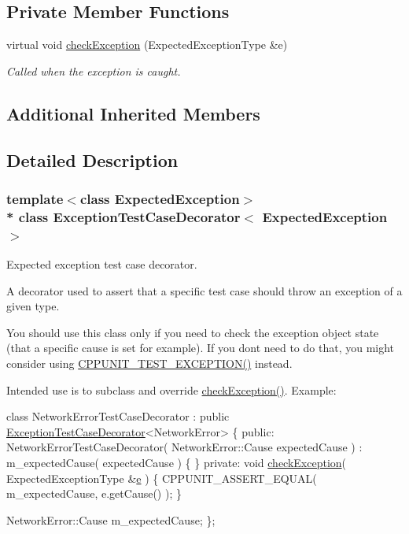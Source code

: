 \subsection*{Private Member Functions}
\begin{DoxyCompactItemize}
\item 
virtual void \hyperlink{class_exception_test_case_decorator_aecb2895a975aacdcafdc3b625e2ca9c1}{check\+Exception} (Expected\+Exception\+Type \&e)
\begin{DoxyCompactList}\small\item\em Called when the exception is caught. \end{DoxyCompactList}\end{DoxyCompactItemize}
\subsection*{Additional Inherited Members}


\subsection{Detailed Description}
\subsubsection*{template$<$class Expected\+Exception$>$\\*
class Exception\+Test\+Case\+Decorator$<$ Expected\+Exception $>$}

Expected exception test case decorator. 

A decorator used to assert that a specific test case should throw an exception of a given type.

You should use this class only if you need to check the exception object state (that a specific cause is set for example). If you don\textquotesingle{}t need to do that, you might consider using \hyperlink{group___writing_test_fixture_ga0d51339f412270aee9a2d6c015d80ef2}{C\+P\+P\+U\+N\+I\+T\+\_\+\+T\+E\+S\+T\+\_\+\+E\+X\+C\+E\+P\+T\+I\+O\+N()} instead.

Intended use is to subclass and override \hyperlink{class_exception_test_case_decorator_aecb2895a975aacdcafdc3b625e2ca9c1}{check\+Exception()}. Example\+:


\begin{DoxyCode}
\textcolor{keyword}{class }NetworkErrorTestCaseDecorator : 
          \textcolor{keyword}{public} \hyperlink{class_exception_test_case_decorator}{ExceptionTestCaseDecorator}<NetworkError>
\{
\textcolor{keyword}{public}:
  NetworkErrorTestCaseDecorator( NetworkError::Cause expectedCause )
      : m\_expectedCause( expectedCause )
  \{
  \}
\textcolor{keyword}{private}:
  \textcolor{keywordtype}{void} \hyperlink{class_exception_test_case_decorator_aecb2895a975aacdcafdc3b625e2ca9c1}{checkException}( ExpectedExceptionType &\hyperlink{group__gtc__constants_gab83fb6de0f05d6c0d11bdf0479f8319e}{e} )
  \{
    CPPUNIT\_ASSERT\_EQUAL( m\_expectedCause, e.getCause() );
  \}

  NetworkError::Cause m\_expectedCause;
\};
\end{DoxyCode}
 

